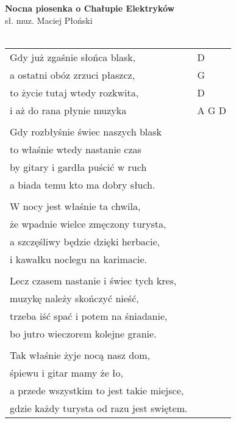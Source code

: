 \documentclass[a5paper]{article}
\begin{document}


\noindent
\fontsize{12pt}{15pt}\selectfont
\textbf{Nocna piosenka o Chałupie Elektryków} \\
\fontsize{8pt}{10pt}\selectfont
sł. muz. Maciej Płoński \\ \\
\fontsize{10pt}{12pt}\selectfont
{}
\begin{tabular}{@{}p{7.50cm}p{3cm}@{}}
\noindent
Gdy już zgaśnie słońca blask, & D \\
a ostatni obóz zrzuci płaszcz, & G \\
to życie tutaj wtedy rozkwita, & D \\
i aż do rana płynie muzyka & A G D \\ \\

Gdy rozbłyśnie świec naszych blask \\
to właśnie wtedy nastanie czas \\
by gitary i gardła puścić w ruch \\
a biada temu kto ma dobry słuch. \\ \\

W nocy jest właśnie ta chwila, \\
że wpadnie wielce zmęczony turysta, \\
a szczęśliwy będzie dzięki herbacie, \\
i kawałku noclegu na karimacie. \\ \\

Lecz czasem nastanie i świec tych kres, \\
muzykę należy skończyć nieść, \\
trzeba iść spać i potem na śniadanie, \\
bo jutro wieczorem kolejne granie. \\ \\

Tak właśnie żyje nocą nasz dom, \\
śpiewu i gitar mamy że ło, \\
a przede wszystkim to jest takie miejsce, \\
gdzie każdy turysta od razu jest swiętem.
\end{tabular}
\end{document}
